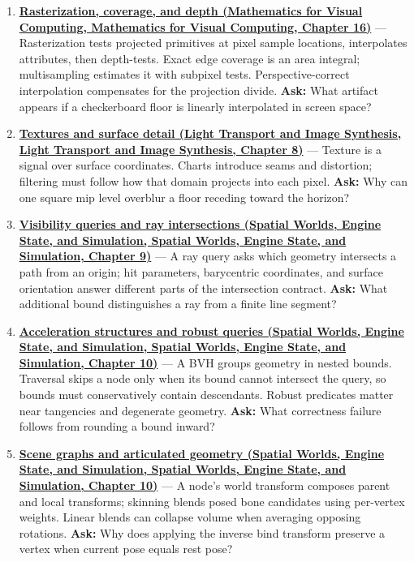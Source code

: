 \begin{enumerate}
\item
  \textbf{\href{../02-Mathematics-for-Visual-Computing/main.pdf\#nameddest=03-visual-computing-i-ch012-rasterization-coverage-and-depth}{Rasterization, coverage, and depth (Mathematics for Visual Computing, Mathematics for Visual Computing, Chapter 16)}} --- Rasterization tests projected primitives at pixel sample locations, interpolates attributes, then depth-tests. Exact edge coverage is an area integral; multisampling estimates it with subpixel tests. Perspective-correct interpolation compensates for the projection divide. \textbf{Ask:} What artifact appears if a checkerboard floor is linearly interpolated in screen space?
\item
  \textbf{\href{../04-Light-Transport-and-Image-Synthesis/main.pdf\#nameddest=03-visual-computing-i-ch019-textures-and-surface-detail}{Textures and surface detail (Light Transport and Image Synthesis, Light Transport and Image Synthesis, Chapter 8)}} --- Texture is a signal over surface coordinates. Charts introduce seams and distortion; filtering must follow how that domain projects into each pixel. \textbf{Ask:} Why can one square mip level overblur a floor receding toward the horizon?
\item
  \textbf{\href{../05-Spatial-Worlds-Engine-State-and-Simulation/main.pdf\#nameddest=04-visual-computing-ii-ch028-visibility-queries-and-ray-intersections-1}{Visibility queries and ray intersections (Spatial Worlds, Engine State, and Simulation, Spatial Worlds, Engine State, and Simulation, Chapter 9)}} --- A ray query asks which geometry intersects a path from an origin; hit parameters, barycentric coordinates, and surface orientation answer different parts of the intersection contract. \textbf{Ask:} What additional bound distinguishes a ray from a finite line segment?
\item
  \textbf{\href{../05-Spatial-Worlds-Engine-State-and-Simulation/main.pdf\#nameddest=04-visual-computing-ii-ch029-acceleration-structures-and-robust-queries-1}{Acceleration structures and robust queries (Spatial Worlds, Engine State, and Simulation, Spatial Worlds, Engine State, and Simulation, Chapter 10)}} --- A BVH groups geometry in nested bounds. Traversal skips a node only when its bound cannot intersect the query, so bounds must conservatively contain descendants. Robust predicates matter near tangencies and degenerate geometry. \textbf{Ask:} What correctness failure follows from rounding a bound inward?
\item
  \textbf{\href{../05-Spatial-Worlds-Engine-State-and-Simulation/main.pdf\#nameddest=04-visual-computing-ii-ch029-scene-graphs-and-articulated-geometry}{Scene graphs and articulated geometry (Spatial Worlds, Engine State, and Simulation, Spatial Worlds, Engine State, and Simulation, Chapter 10)}} --- A node's world transform composes parent and local transforms; skinning blends posed bone candidates using per-vertex weights. Linear blends can collapse volume when averaging opposing rotations. \textbf{Ask:} Why does applying the inverse bind transform preserve a vertex when current pose equals rest pose?

\end{enumerate}
